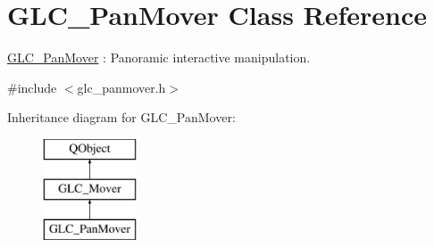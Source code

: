 \hypertarget{class_g_l_c___pan_mover}{\section{G\-L\-C\-\_\-\-Pan\-Mover Class Reference}
\label{class_g_l_c___pan_mover}
}


\hyperlink{class_g_l_c___pan_mover}{G\-L\-C\-\_\-\-Pan\-Mover} \-: Panoramic interactive manipulation.  




{\ttfamily \#include $<$glc\-\_\-panmover.\-h$>$}

Inheritance diagram for G\-L\-C\-\_\-\-Pan\-Mover\-:\begin{figure}[H]
\begin{center}
\leavevmode
\includegraphics[height=3.000000cm]{class_g_l_c___pan_mover}
\end{center}
\end{figure}
